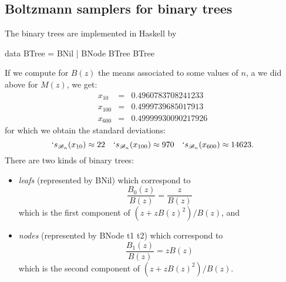 \documentclass{sig-alternate}
\newcommand{\Bt}{\mathscr{B}}
\begin{document}
\subsection{Boltzmann samplers for binary trees}
The binary trees are implemented in \textsf{Haskell} by
\begin{haskell}
  data BTree = BNil | BNode BTree BTree
\end{haskell}
If we compute for $B(z)$ the means associated to some values of $n$, a we did above
for $M(z)$, we get:
\begin{eqnarray*}
  x_{10} &=& 0.4960783708241233 \\  
  x_{100} &=& 0.4999739685017913 \\ 
  x_{600} &=& 0.49999930090217926
\end{eqnarray*}
for which we obtain the standard deviations:
\begin{displaymath}
  `s_{\Bt_n}(x_{10}) \approx  22 \quad `s_{\Bt_n}(x_{100}) \approx  970 \quad  `s_{\Bt_n}(x_{600}) \approx 14623.
\end{displaymath}
There are two kinds of binary trees:
\begin{itemize}
\item \emph{leafs} (represented by \<BNil\>) which correspond to
  \begin{displaymath}
    \frac{B_0(z)}{B(z)} = \frac{z}{B(z)}
\end{displaymath}
which is the first component of $(z + z B(z)^2)/B(z)$,
  and
\item \emph{nodes} (represented by \<BNode t1 t2\>) which correspond to
  \begin{displaymath}
\frac{B_1(z) }{B(z)} = z B(z)
\end{displaymath}
which is the
  second component of $(z + z B(z)^2)/B(z)$.
\end{itemize}
\end{document}

